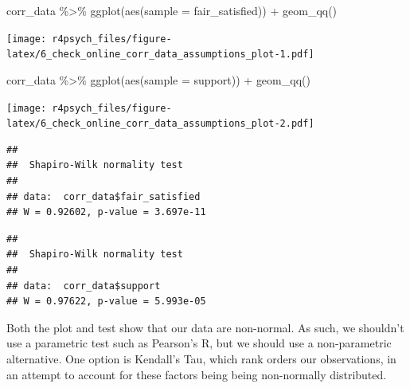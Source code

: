 \documentclass[
]{book}
\newenvironment{Shaded}{\begin{snugshade}}{\end{snugshade}}
\newcommand{\AttributeTok}[1]{\textcolor[rgb]{0.77,0.63,0.00}{#1}}
\newcommand{\FunctionTok}[1]{\textcolor[rgb]{0.00,0.00,0.00}{#1}}
\newcommand{\NormalTok}[1]{#1}
\newcommand{\SpecialCharTok}[1]{\textcolor[rgb]{0.00,0.00,0.00}{#1}}
\begin{document}
\begin{Shaded}
\begin{Highlighting}[]
\NormalTok{corr\_data }\SpecialCharTok{\%\textgreater{}\%}
  \FunctionTok{ggplot}\NormalTok{(}\FunctionTok{aes}\NormalTok{(}\AttributeTok{sample =}\NormalTok{ fair\_satisfied)) }\SpecialCharTok{+}
    \FunctionTok{geom\_qq}\NormalTok{()}
\end{Highlighting}
\end{Shaded}

\texttt{[image: r4psych\_files/figure-latex/6\_check\_online\_corr\_data\_assumptions\_plot-1.pdf]}

\begin{Shaded}
\begin{Highlighting}[]
\NormalTok{corr\_data }\SpecialCharTok{\%\textgreater{}\%}
  \FunctionTok{ggplot}\NormalTok{(}\FunctionTok{aes}\NormalTok{(}\AttributeTok{sample =}\NormalTok{ support)) }\SpecialCharTok{+}
    \FunctionTok{geom\_qq}\NormalTok{()}
\end{Highlighting}
\end{Shaded}

\texttt{[image: r4psych\_files/figure-latex/6\_check\_online\_corr\_data\_assumptions\_plot-2.pdf]}

\begin{Shaded}
\end{Shaded}

\begin{verbatim}
## 
##  Shapiro-Wilk normality test
## 
## data:  corr_data$fair_satisfied
## W = 0.92602, p-value = 3.697e-11
\end{verbatim}

\begin{Shaded}
\end{Shaded}

\begin{verbatim}
## 
##  Shapiro-Wilk normality test
## 
## data:  corr_data$support
## W = 0.97622, p-value = 5.993e-05
\end{verbatim}

Both the plot and test show that our data are non-normal. As such, we shouldn't use a parametric test such as Pearson's R, but we should use a non-parametric alternative. One option is Kendall's Tau, which rank orders our observations, in an attempt to account for these factors being being non-normally distributed.
\end{document}
